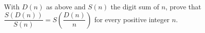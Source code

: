 With $D(n)$ as above and $S(n)$ the digit sum of $n$, prove that $\dfrac{S(D(n))}{S(n)}=S\!\left(\dfrac{D(n)}n\right)$ for every positive integer $n$.
